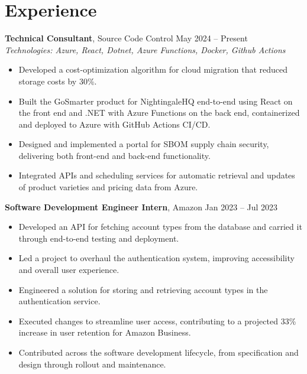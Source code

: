 \documentclass[11pt,a4paper]{article}
\begin{document}
\section{Experience}
\textbf{Technical Consultant}, Source Code Control \hfill May 2024 -- Present
\\ \textit{Technologies: Azure, React, Dotnet, Azure Functions, Docker, Github Actions}
\begin{itemize}
  \item Developed a cost-optimization algorithm for cloud migration that reduced storage costs by 30\%.
  \item Built the GoSmarter product for NightingaleHQ end-to-end using React on the front end and .NET with Azure Functions on the back end, containerized and deployed to Azure with GitHub Actions CI/CD.
  \item Designed and implemented a portal for SBOM supply chain security, delivering both front-end and back-end functionality.
  \item Integrated APIs and scheduling services for automatic retrieval and updates of product varieties and pricing data from Azure.
\end{itemize}
\vspace{2pt}
\textbf{Software Development Engineer Intern}, Amazon \hfill Jan 2023 -- Jul 2023
\begin{itemize}
  \item Developed an API for fetching account types from the database and carried it through end-to-end testing and deployment.
  \item Led a project to overhaul the authentication system, improving accessibility and overall user experience.
  \item Engineered a solution for storing and retrieving account types in the authentication service.
  \item Executed changes to streamline user access, contributing to a projected 33\% increase in user retention for Amazon Business.
  \item Contributed across the software development lifecycle, from specification and design through rollout and maintenance.
\end{itemize}
\vspace{2pt}
\end{document}
